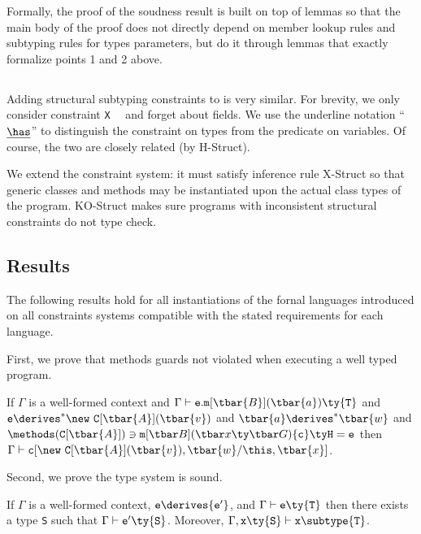 Formally, the proof of the soudness result is built on top of lemmas so that the main body of the proof does not directly depend on member lookup rules and subtyping rules for types parameters, but do it through lemmas that exactly formalize points 1 and 2 above.



\subsection{}
Adding structural subtyping constraints to \FXGL{\cdot} is very similar. For brevity, we only consider constraint {\tt X}~\underline{\has}~ and forget about fields. We use the underline notation ``$\underline{\has}$'' to distinguish the constraint on types from the predicate on variables. Of course, the two are closely related (by {\sc H-Struct}).

We extend the constraint system: it must satisfy inference rule {\sc X-Struct} so that generic classes and methods may be instantiated upon the actual class types of the program. {\sc KO-Struct} makes sure programs with inconsistent structural constraints do not type check.




\subsection{Results}
The following results hold for all instantiations of the fornal languages introduced on all constraints systems compatible with the stated requirements for each language.

First, we prove that methods guards not violated when executing a well typed program.
\begin{theorem} If $\Gamma$ is a well-formed context and $\Gamma \vdash {\tt e}.{\tt m}[\tbar{B}](\tbar{a})\ty{\tt T}$ and ${\tt e} \derives^*	 \new~{\tt C}[\tbar{A}](\tbar{v})$ and $\tbar{a} \derives^* \tbar{w}$ and $\methods({\tt C}[\tbar{A}])\ni\minst{B}{x}{G}{c}{H}{e}$ then $\Gamma\vdash {\tt c}[\new~{\tt C}[\tbar{A}](\tbar{v}),\tbar{w}/\this,\tbar{x}]$.
\end{theorem}

Second, we prove the type system is sound.

\begin{lemma} If $\Gamma$ is a well-formed context, ${\tt e} \derives {\tt e'}$, and $\Gamma \vdash {\tt e}\ty{\tt T}$ then there exists a type {\tt S} such that $\Gamma\vdash{\tt e'}\ty{\tt S}$. Moreover, $\Gamma,{\tt x}\ty{\tt S} \vdash {\tt x}\subtype{\tt T}$.
\end{lemma}

